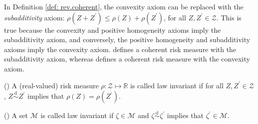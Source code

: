 \documentclass[final,onefignum,onetabnum]{class}
\DeclareMathOperator*{\esssup}{ess\,sup}
\newcommand{\e}[1]{\mathbb{E} \left[ #1 \right]}
\newcommand{\vvar}[2]{\mathrm{VaR}_{#1} \left[ #2 \right]}
\newcommand{\cvart}{\mathrm{CVaR}}
\newcommand{\ccvar}[2]{\mathrm{CVaR}_{#1} \left[ #2 \right]}
\newcommand{\Bs}[1]{\mathbb{#1}} %
\newcommand{\Cs}[1]{\mathcal{#1}} %
\newcommand{\Prob}[1]{{\rm Prob} \{#1 \} }
\begin{document}
\begin{remark}
    In Definition \ref{def: rev.coherent}, the convexity axiom can be replaced with the {\it subadditivity} axiom: $\rho\left( Z+Z^{\prime} \right) \le \rho(Z) + \rho(Z^{\prime})$, for all $Z, Z^{\prime} \in \Cs{Z}$. This is true because the convexity and positive homogeneity axioms imply the subadditivity axiom, and conversely, the positive homogeneity and subadditivity axioms imply the convexity axiom. \citet[Definition~2.4]{artzner1999} defines a coherent risk measure with the subadditivity axiom, whereas \citet[Definition~6.4]{shapiro2014SP}  defines a coherent risk measure with the convexity axiom. 
\end{remark}



\begin{definition}{(\citet[Definition~2.1]{shapiro2017DRSP})}
\label{def: rev.law_invariant_measure}
A (real-valued) risk measure $\rho: \Cs{Z} \mapsto \Bs{R}$ is called law invariant if for all $Z, Z^{\prime} \in \Cs{Z}$,  $Z \overset{\text{d}}{\sim} Z^{\prime}$ implies that $\rho(Z)=\rho(Z^{\prime})$. 
\end{definition}

\begin{definition}{(\citet[Definition~2.2]{shapiro2017DRSP})}
\label{def: rev.law_invariant_set}
A set $\Cs{M}$ is called law invariant if $\zeta \in \Cs{M}$ and $\zeta \overset{\text{d}}{\sim} \zeta^{\prime}$ implies that $\zeta^{\prime} \in \Cs{M}$.
\end{definition}
\end{document}
